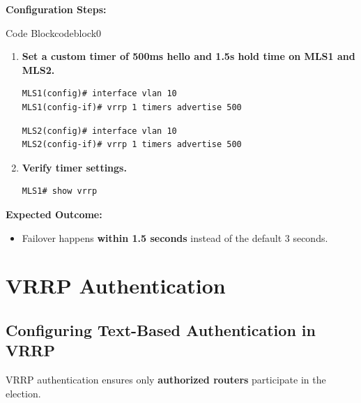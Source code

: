 \documentclass[a4paper]{book}
\begin{document}
\textbf{Configuration Steps:}

\vspace{1.5em}


\begin{ocg}{Code Block}{codeblock}{0}

\vspace{0.5cm}
\begin{enumerate}
\item \textbf{Set a custom timer of 500ms hello and 1.5s hold time on MLS1 and MLS2.}
\begin{lstlisting}
MLS1(config)# interface vlan 10
MLS1(config-if)# vrrp 1 timers advertise 500
\end{lstlisting}
\begin{lstlisting}
MLS2(config)# interface vlan 10
MLS2(config-if)# vrrp 1 timers advertise 500
\end{lstlisting}

\item \textbf{Verify timer settings.}
\begin{lstlisting}
MLS1# show vrrp
\end{lstlisting}
\end{enumerate}
\end{ocg}




\textbf{Expected Outcome:}
\begin{itemize}
\item Failover happens \textbf{within 1.5 seconds} instead of the default 3 seconds.
\end{itemize}


\vspace{1.5em}

\section{VRRP Authentication}

\subsection{Configuring Text-Based Authentication in VRRP}
VRRP authentication ensures only \textbf{authorized routers} participate in the election.
\end{document}
